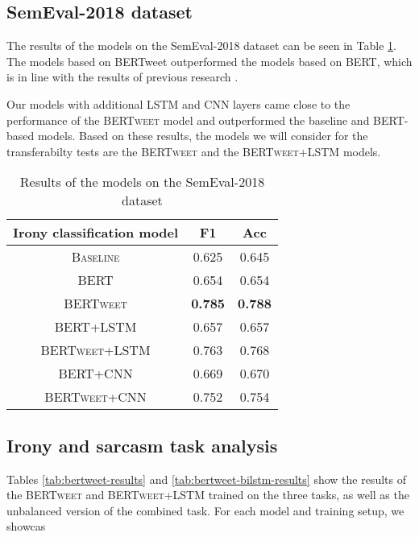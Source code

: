 \documentclass[10pt, a4paper]{article}
\begin{document}
\subsection{SemEval-2018 dataset}\label{semeval-results}

The results of the models on the SemEval-2018 dataset can be seen in Table \ref{tab:semeval-2018}. The models based on
BERTweet outperformed the models based on BERT, which is in line with the results of previous research \citep{bertweet}.

Our models with additional LSTM and CNN layers came close to the performance of the \textsc{BERTweet} model and outperformed
the baseline and BERT-based models. Based on these results, the models we will consider for the transferabilty tests are the
\textsc{BERTweet} and the \textsc{BERTweet+LSTM} models.

\begin{table}[h]
   \caption{Results of the models on the SemEval-2018 dataset}
   \label{tab:semeval-2018}
   \begin{center}
   \begin{tabular}{|c|c|c|}
   \toprule
   Irony classification model & F1 & Acc\\
   \midrule
   \textsc{Baseline} & 0.625 & 0.645 \\
   \textsc{BERT} & 0.654 & 0.654 \\
   \textsc{BERTweet} & \textbf{0.785} & \textbf{0.788} \\
   \textsc{BERT+LSTM} & 0.657 & 0.657 \\
   \textsc{BERTweet+LSTM} & 0.763 & 0.768 \\
   \textsc{BERT+CNN} & 0.669 & 0.670 \\
   \textsc{BERTweet+CNN} & 0.752 & 0.754 \\
   \bottomrule
   \end{tabular}
   \end{center}
\end{table}

\subsection{Irony and sarcasm task analysis}\label{task-analysis}

Tables \ref{tab:bertweet-results} and \ref{tab:bertweet-bilstm-results} show the results of the \textsc{BERTweet} and
\textsc{BERTweet+LSTM} trained on the three tasks, as well as the unbalanced version of the combined task. For each model
and training setup, we showcas
\end{document}
